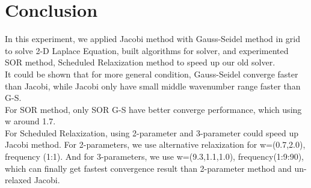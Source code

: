 \documentclass[12pt]{article}
\begin{document}
\section{Conclusion}

In this experiment, we applied Jacobi method with Gauss-Seidel method in grid to 
solve 2-D Laplace Equation, built algorithms for solver, and experimented SOR method,
Scheduled Relaxization method to speed up our old solver.\\

It could be shown that for more general condition, Gauss-Seidel converge faster than
Jacobi, while Jacobi only have small middle wavenumber range faster than G-S.\\

For SOR method, only SOR G-S have better converge performance, which using w around
1.7.\\

For Scheduled Relaxization, using 2-parameter and 3-parameter could speed up Jacobi
method. For 2-parameters, we use alternative relaxization for w=(0.7,2.0), 
frequency (1:1). And for 3-parameters, we use w=(9.3,1.1,1.0), frequency(1:9:90), 
which can finally get fastest convergence result than 2-parameter method and un-relaxed
Jacobi.









\newpage
\end{document}
